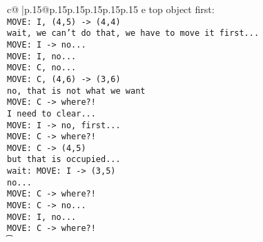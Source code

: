 \documentclass{article}
\begin{document}
{\begin{supertabular}{c@{$\;$}|p{.15\linewidth}@{}p{.15\linewidth}p{.15\linewidth}p{.15\linewidth}p{.15\linewidth}p{.15\linewidth}}
{{{e top object first: \\ \tt  MOVE: I, (4,5) -> (4,4) \\ \tt  wait, we can't do that, we have to move it first...\\ \tt  MOVE: I -> no...\\ \tt  MOVE: I, no...\\ \tt  MOVE: C, no... \\ \tt  MOVE: C, (4,6) -> (3,6) \\ \tt  no, that is not what we want\\ \tt  MOVE: C -> where?!\\ \tt  I need to clear...\\ \tt  MOVE: I -> no, first...\\ \tt  MOVE: C -> where?!\\ \tt  MOVE: C -> (4,5) \\ \tt  but that is occupied...\\ \tt  wait: MOVE: I -> (3,5) \\ \tt  no... \\ \tt  MOVE: C -> where?!\\ \tt  MOVE: C -> no...\\ \tt  MOVE: I, no...\\ \tt  MOVE: C -> where?!\\ \t}}}
\end{supertabular}}
\end{document}
